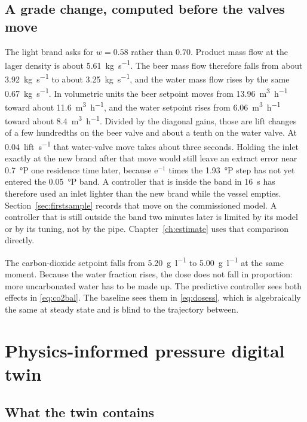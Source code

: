\subsection{A grade change, computed before the valves move}

The light brand asks for $w=0.58$ rather than $0.70$. Product mass flow at the lager density is about \SI{5.61}{\kilogram\per\second}. The beer mass flow therefore falls from about \SI{3.92}{\kilogram\per\second} to about \SI{3.25}{\kilogram\per\second}, and the water mass flow rises by the same \SI{0.67}{\kilogram\per\second}. In volumetric units the beer setpoint moves from \SI{13.96}{\cubic\metre\per\hour} toward about \SI{11.6}{\cubic\metre\per\hour}, and the water setpoint rises from \SI{6.06}{\cubic\metre\per\hour} toward about \SI{8.4}{\cubic\metre\per\hour}. Divided by the diagonal gains, those are lift changes of a few hundredths on the beer valve and about a tenth on the water valve. At \SI{0.04}{lift\per\second} that water-valve move takes about three seconds. Holding the inlet exactly at the new brand after that move would still leave an extract error near \SI{0.7}{\degree}P one residence time later, because $\mathrm{e}^{-1}$ times the \SI{1.93}{\degree}P step has not yet entered the \SI{0.05}{\degree}P band. A controller that is inside the band in \SI{16}{\second} has therefore used an inlet lighter than the new brand while the vessel empties. Section~\ref{sec:firstsample} records that move on the commissioned model. A controller that is still outside the band two minutes later is limited by its model or by its tuning, not by the pipe. Chapter~\ref{ch:estimate} uses that comparison directly.

The carbon-dioxide setpoint falls from \SI{5.20}{\gram\per\litre} to \SI{5.00}{\gram\per\litre} at the same moment. Because the water fraction rises, the dose does not fall in proportion: more uncarbonated water has to be made up. The predictive controller sees both effects in \eqref{eq:co2bal}. The baseline sees them in \eqref{eq:dosess}, which is algebraically the same at steady state and is blind to the trajectory between.



\section{Physics-informed pressure digital twin}
\label{sec:twin}

\subsection{What the twin contains}

